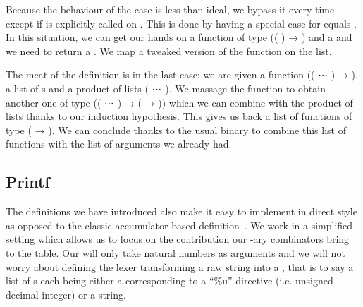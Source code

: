 {Because the behaviour of the  case is less than ideal, we bypass it
every time except if  is explicitly called on . This is
done by having a special case for  equals . In this situation,
we can get our hands on a function  of type
{((  ) → )} and a { } and we need to
return a { }. We map a tweaked version of the function on the list.


The meat of the definition is in the last case: we are given a function
{((    ⋯  ) → )}, a list of s
and a product of lists {(   ⋯   )}.
We massage the function to obtain another one of type
{((  ⋯  ) → ( → ))} which we can
combine with the product of lists thanks to our induction hypothesis. This gives
us back a list of functions of type {( → )}. We can conclude thanks
to the usual binary  to combine this list of functions with the list
of arguments we already had.


\subsection{Printf}\label{sec:printf}

The definitions we have introduced also make it easy to implement 
in direct style as opposed to the classic accumulator-based
definition~\cite{DBLP:conf/icfp/Augustsson98,DBLP:journals/jfp/Danvy98}. We work in a
simplified setting which allows us to focus on the contribution our -ary
combinators bring to the table. Our  will only take natural numbers
as arguments and we will not worry about defining the lexer transforming a raw
string into a , that is to say a list of s each being
either a  corresponding to a ``\%u'' directive (i.e. unsigned decimal
integer) or a  string.

\begin{minipage}[t]{0.25\textwidth}
\end{minipage}\begin{minipage}[t]{0.2\textwidth}
\end{minipage}

}
